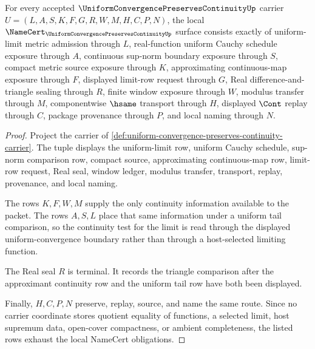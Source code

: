 \begin{theorem}
\label{thm:uniform-convergence-preserves-continuity-namecert-obligations}
For every accepted $\UniformConvergencePreservesContinuityUp$ carrier $U=(L,A,S,K,F,G,R,W,M,H,C,P,N)$, the local $\NameCert_{\UniformConvergencePreservesContinuityUp}$ surface consists exactly of uniform-limit metric admission through $L$, real-function uniform Cauchy schedule exposure through $A$, continuous sup-norm boundary exposure through $S$, compact metric source exposure through $K$, approximating continuous-map exposure through $F$, displayed limit-row request through $G$, Real difference-and-triangle sealing through $R$, finite window exposure through $W$, modulus transfer through $M$, componentwise $\hsame$ transport through $H$, displayed $\Cont$ replay through $C$, package provenance through $P$, and local naming through $N$.
\end{theorem}
\begin{proof}
Project the carrier of \autoref{def:uniform-convergence-preserves-continuity-carrier}. The tuple displays the uniform-limit row, uniform Cauchy schedule, sup-norm comparison row, compact source, approximating continuous-map row, limit-row request, Real seal, window ledger, modulus transfer, transport, replay, provenance, and local naming.

The rows $K,F,W,M$ supply the only continuity information available to the packet. The rows $A,S,L$ place that same information under a uniform tail comparison, so the continuity test for the limit is read through the displayed uniform-convergence boundary rather than through a host-selected limiting function.

The Real seal $R$ is terminal. It records the triangle comparison after the approximant continuity row and the uniform tail row have both been displayed.

Finally, $H,C,P,N$ preserve, replay, source, and name the same route. Since no carrier coordinate stores quotient equality of functions, a selected limit, host supremum data, open-cover compactness, or ambient completeness, the listed rows exhaust the local NameCert obligations.
\end{proof}

